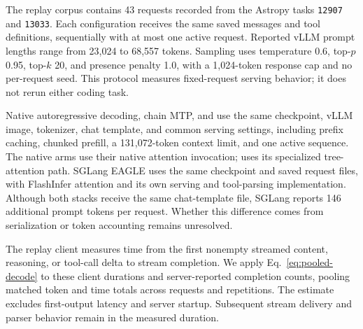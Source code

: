 The replay corpus contains 43 requests recorded from the Astropy tasks \texttt{12907} and \texttt{13033}. Each configuration receives the same saved messages and tool definitions, sequentially with at most one active request. Reported vLLM prompt lengths range from 23,024 to 68,557 tokens. Sampling uses temperature 0.6, top-$p$ 0.95, top-$k$ 20, and presence penalty 1.0, with a 1,024-token response cap and no per-request seed. This protocol measures fixed-request serving behavior; it does not rerun either coding task.

Native autoregressive decoding, chain MTP, and \sys{} use the same checkpoint, vLLM image, tokenizer, chat template, and common serving settings, including prefix caching, chunked prefill, a 131,072-token context limit, and one active sequence. The native arms use their native attention invocation; \sys{} uses its specialized tree-attention path. SGLang EAGLE uses the same checkpoint and saved request files, with FlashInfer attention and its own serving and tool-parsing implementation. Although both stacks receive the same chat-template file, SGLang reports 146 additional prompt tokens per request. Whether this difference comes from serialization or token accounting remains unresolved.

The replay client measures time from the first nonempty streamed content, reasoning, or tool-call delta to stream completion. We apply Eq.~\ref{eq:pooled-decode} to these client durations and server-reported completion counts, pooling matched token and time totals across requests and repetitions. The estimate excludes first-output latency and server startup. Subsequent stream delivery and parser behavior remain in the measured duration.
